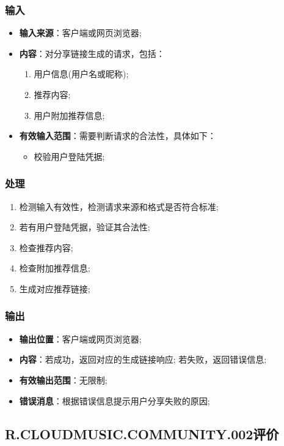 \subsubsection{输入}
	\begin{itemize}
		\item \textbf{输入来源}：客户端或网页浏览器;
		\item \textbf{内容}：对分享链接生成的请求，包括：
		\begin{enumerate}
			\item 用户信息(用户名或昵称);
			\item 推荐内容;
			\item 用户附加推荐信息;
		\end{enumerate}
		\item \textbf{有效输入范围}：需要判断请求的合法性，具体如下：
		\begin{itemize}
			\item 校验用户登陆凭据;
		\end{itemize}
	\end{itemize}
\subsubsection{处理}
	\begin{enumerate}
		\item 检测输入有效性，检测请求来源和格式是否符合标准;
		\item 若有用户登陆凭据，验证其合法性;
		\item 检查推荐内容;
		\item 检查附加推荐信息;
		\item 生成对应推荐链接;
	\end{enumerate}
\subsubsection{输出}
\begin{itemize}
	\item \textbf{输出位置}：客户端或网页浏览器;
	\item \textbf{内容}：若成功，返回对应的生成链接响应; 若失败，返回错误信息;
	\item \textbf{有效输出范围}：无限制;
	\item \textbf{错误消息}：根据错误信息提示用户分享失败的原因;
\end{itemize}

\subsection{R.CLOUDMUSIC.COMMUNITY.002评价}
